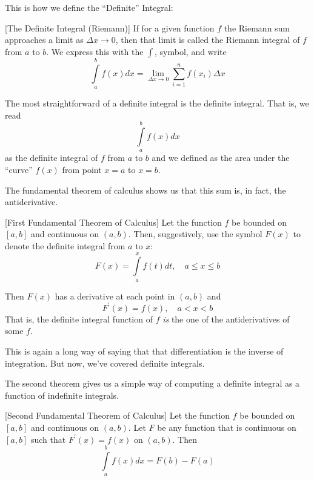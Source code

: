 \documentclass[]{book}
\theoremstyle{definition}
\theoremstyle{definition}
\theoremstyle{definition}
\theoremstyle{remark}
\begin{document}
This is how we define the ``Definite'' Integral:

[The Definite Integral (Riemann)]
\protect\hypertarget{def:unnamed-chunk-26}{}{\label{def:unnamed-chunk-26} {} }If for a given function \(f\) the Riemann sum approaches a limit as \(\Delta x \to 0\), then that limit is called the Riemann integral of \(f\) from \(a\) to \(b\). We express this with the \(\int\), symbol, and write \[\int\limits_a^b f(x) dx= \lim\limits_{\Delta x\to 0} \sum\limits_{i=1}^n f(x_i)\Delta x\]

The most straightforward of a definite integral is the definite integral. That is, we read
\[\int\limits_a^b f(x) dx\] as the definite integral of \(f\) from \(a\) to \(b\) and we defined as the area under the ``curve'' \(f(x)\) from point \(x=a\) to \(x=b\).

The fundamental theorem of calculus shows us that this sum is, in fact, the antiderivative.

[First Fundamental Theorem of Calculus]
\protect\hypertarget{thm:unnamed-chunk-27}{}{\label{thm:unnamed-chunk-27} {} }Let the function \(f\) be bounded on \([a,b]\) and continuous on \((a,b)\). Then, suggestively, use the symbol \(F(x)\) to denote the definite integral from \(a\) to \(x\):
\[F(x)=\int\limits_a^x f(t)dt, \quad a\le x\le b\]

Then \(F(x)\) has a derivative at each point in \((a,b)\) and \[F^\prime(x)=f(x), \quad a<x<b\]
That is, the definite integral function of \(f\) \emph{is} the one of the antiderivatives of some \(f\).

This is again a long way of saying that that differentiation is the inverse of integration. But now, we've covered definite integrals.

The second theorem gives us a simple way of computing a definite integral as a function of indefinite integrals.

[Second Fundamental Theorem of Calculus]
\protect\hypertarget{thm:unnamed-chunk-28}{}{\label{thm:unnamed-chunk-28} {} }Let the function \(f\) be bounded on \([a,b]\) and continuous on \((a,b)\). Let \(F\) be any function that is continuous on \([a,b]\) such that \(F^\prime(x)=f(x)\) on \((a,b)\). Then \[\int\limits_a^bf(x)dx = F(b)-F(a)\]
\end{document}
